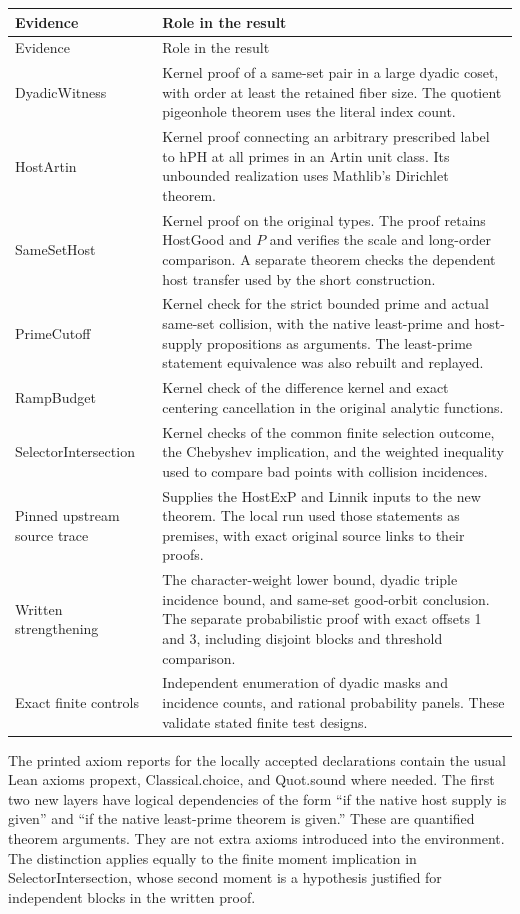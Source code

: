 \documentclass[12pt,letterpaper]{article}
\DeclareRobustCommand{\id}[1]{\mbox{\small\ttfamily #1}}
\begin{document}
\begin{longtable}{@{}p{.31\linewidth}p{.62\linewidth}@{}}
\toprule
Evidence & Role in the result\\
\midrule
\endfirsthead
\toprule
Evidence & Role in the result\\
\midrule
\endhead
\id{DyadicWitness} &
Kernel proof of a same-set pair in a large dyadic coset, with order at least the retained fiber size. The quotient pigeonhole theorem uses the literal index count.\\
\id{HostArtin} &
Kernel proof connecting an arbitrary prescribed label to \id{hPH} at all primes in an Artin unit class. Its unbounded realization uses Mathlib's Dirichlet theorem.\\
\id{SameSetHost} &
Kernel proof on the original types. The proof retains \id{HostGood} and \(P\) and verifies the scale and long-order comparison. A separate theorem checks the dependent host transfer used by the short construction.\\
\id{PrimeCutoff} &
Kernel check for the strict bounded prime and actual same-set collision, with the native least-prime and host-supply propositions as arguments. The least-prime statement equivalence was also rebuilt and replayed.\\
\id{RampBudget} &
Kernel check of the difference kernel and exact centering cancellation in the original analytic functions.\\
\id{SelectorIntersection} &
Kernel checks of the common finite selection outcome, the Chebyshev implication, and the weighted inequality used to compare bad points with collision incidences.\\
Pinned upstream source trace &
Supplies the \id{HostExP} and \id{Linnik} inputs to the new theorem. The local run used those statements as premises, with exact original source links to their proofs.\\
Written strengthening &
The character-weight lower bound, dyadic triple incidence bound, and same-set good-orbit conclusion. The separate probabilistic proof with exact offsets 1 and 3, including disjoint blocks and threshold comparison.\\
Exact finite controls &
Independent enumeration of dyadic masks and incidence counts, and rational probability panels. These validate stated finite test designs.\\
\bottomrule
\end{longtable}

The printed axiom reports for the locally accepted declarations contain the usual Lean axioms \id{propext}, \id{Classical.choice}, and \id{Quot.sound} where needed. The first two new layers have logical dependencies of the form “if the native host supply is given” and “if the native least-prime theorem is given.” These are quantified theorem arguments. They are not extra axioms introduced into the environment. The distinction applies equally to the finite moment implication in \id{SelectorIntersection}, whose second moment is a hypothesis justified for independent blocks in the written proof.
\end{document}

